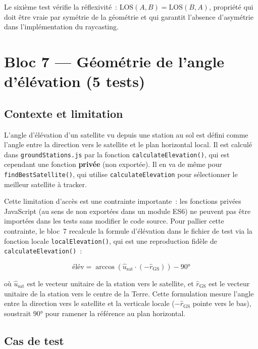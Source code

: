 \documentclass[12pt,a4paper]{article}
\begin{document}
Le sixième test vérifie la réflexivité~: $\text{LOS}(A, B) = \text{LOS}(B, A)$, propriété qui doit être vraie par symétrie de la géométrie et qui garantit l'absence d'asymétrie dans l'implémentation du raycasting.

\section{Bloc 7 — Géométrie de l'angle d'élévation (5 tests)}

\subsection{Contexte et limitation}

L'angle d'élévation d'un satellite vu depuis une station au sol est défini comme l'angle entre la direction vers le satellite et le plan horizontal local. Il est calculé dans \texttt{groundStations.js} par la fonction \texttt{calculateElevation()}, qui est cependant une fonction \textbf{privée} (non exportée). Il en va de même pour \texttt{findBestSatellite()}, qui utilise \texttt{calculateElevation} pour sélectionner le meilleur satellite à tracker.

Cette limitation d'accès est une contrainte importante~: les fonctions privées JavaScript (au sens de non exportées dans un module ES6) ne peuvent pas être importées dans les tests sans modifier le code source. Pour pallier cette contrainte, le bloc~7 recalcule la formule d'élévation dans le fichier de test via la fonction locale \texttt{localElevation()}, qui est une reproduction fidèle de \texttt{calculateElevation()}~:

\begin{equation}
    \text{élév} = \arccos\!\left(\hat{u}_\text{sat} \cdot (-\hat{r}_\text{GS})\right) - 90°
\end{equation}

où $\hat{u}_\text{sat}$ est le vecteur unitaire de la station vers le satellite, et $\hat{r}_\text{GS}$ est le vecteur unitaire de la station vers le centre de la Terre. Cette formulation mesure l'angle entre la direction vers le satellite et la verticale locale ($-\hat{r}_\text{GS}$ pointe vers le bas), soustrait $90°$ pour ramener la référence au plan horizontal.

\subsection{Cas de test}
\end{document}
